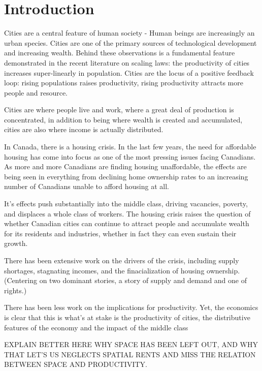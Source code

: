 \chapter{Introduction}

Cities are a central feature of human society - Human beings are increasingly an urban species. Cities are one of the primary sources of technological development and increasing wealth. Behind these observations is a fundamental feature demonstrated in the recent literature on scaling laws: the productivity of cities increases super-linearly in population. Cities are the locus of a positive feedback loop: rising populations raises productivity, rising productivity attracts more people and resource.

Cities are where people live and work, where a great deal of production is concentrated, in addition to being where wealth is created and accumulated, cities are also where income is actually distributed. 

In Canada, there is a housing crisis. In the last few years, the need for affordable housing has come into focus as one of the most pressing issues facing Canadians. As more and more Canadians are finding housing unaffordable, the effects are being seen in everything from declining home ownership rates to an increasing number of Canadians unable to afford housing at all.

It's effects push substantially into the middle class, driving vacancies, poverty, and displaces a whole class of workers.
The housing crisis raises the question of whether Canadian cities can continue to attract people and accumulate wealth for its residents and industries, whether in fact they can even sustain their growth.

There has been extensive work on the drivers of the crisis, including supply shortages, stagnating incomes, and the finacialization of housing ownership.
(Centering on two dominant stories, a story of supply and demand and one of rights.) %

There has been less work on the implications for productivity. 
Yet, the economics is clear that this is what's at stake is the productivity of cities, the distributive features of the economy and the impact of the middle class %

EXPLAIN BETTER HERE WHY SPACE HAS BEEN LEFT OUT, AND WHY THAT LET'S US NEGLECTS SPATIAL RENTS AND MISS THE RELATION BETWEEN SPACE AND PRODUCTIVITY.

